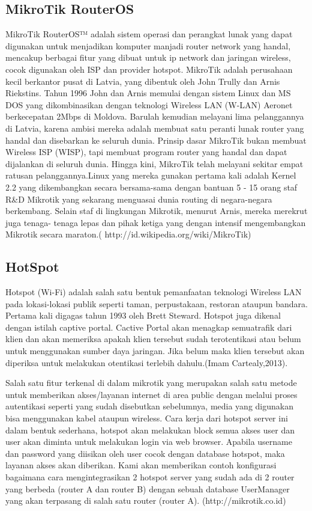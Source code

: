 \documentclass{jtetiproposalskripsi}
\begin{document}
\subsection{MikroTik RouterOS}
MikroTik RouterOS™ adalah sistem operasi dan perangkat lunak yang dapat  digunakan  untuk  menjadikan  komputer  manjadi  router  network  yang handal, mencakup berbagai fitur yang dibuat untuk ip network dan jaringan wireless, cocok digunakan oleh ISP dan provider hotspot.
MikroTik  adalah  perusahaan  kecil  berkantor  pusat  di  Latvia,  yang dibentuk oleh  John  Trully dan  Arnis  Riekstins.  Tahun  1996  John  dan  Arnis memulai dengan sistem Linux dan MS DOS yang dikombinasikan dengan teknologi Wireless LAN (W-LAN) Aeronet berkecepatan 2Mbps di Moldova. Barulah kemudian melayani lima pelanggannya di Latvia, karena ambisi mereka adalah membuat satu peranti lunak router yang handal dan disebarkan ke seluruh dunia.  Prinsip  dasar  MikroTik  bukan  membuat  Wireless  ISP  (WISP),  tapi membuat program router yang handal dan dapat dijalankan di seluruh dunia. Hingga kini, MikroTik telah melayani sekitar empat ratusan pelanggannya.Linux yang mereka gunakan pertama kali adalah Kernel 2.2 yang dikembangkan secara  bersama-sama dengan  bantuan  5  -  15  orang staf  R\&D Mikrotik yang sekarang menguasai dunia routing di negara-negara berkembang. Selain staf di lingkungan Mikrotik, menurut Arnis, mereka merekrut juga tenaga- tenaga lepas dan pihak ketiga yang dengan intensif mengembangkan Mikrotik secara maraton.( http://id.wikipedia.org/wiki/MikroTik)

\subsection{ HotSpot}
Hotspot (Wi-Fi) adalah salah satu bentuk pemanfaatan teknologi Wireless LAN  pada  lokasi-lokasi  publik  seperti  taman,  perpustakaan, restoran  ataupun bandara.  Pertama  kali  digagas  tahun  1993  oleh  Brett  Steward.  Hotspot  juga dikenal dengan istilah captive portal. Cactive Portal akan menagkap semuatrafik dari klien dan akan memeriksa apakah klien tersebut sudah terotentikasi atau belum untuk menggunakan sumber daya jaringan. Jika belum maka klien tersebut akan diperiksa untuk melakukan otentikasi terlebih dahulu.(Imam Cartealy,2013). 



Salah satu fitur terkenal di dalam mikrotik yang merupakan salah satu metode untuk memberikan akses/layanan internet di area public dengan melalui proses autentikasi seperti yang sudah disebutkan sebelumnya, media yang digunakan bisa menggunakan kabel ataupun wireless. Cara kerja dari hotspot server ini dalam bentuk sederhana, hotspot akan melakukan block semua akses user dan user akan diminta untuk melakukan login via web browser. Apabila username dan password yang diisikan oleh user cocok dengan database hotspot, maka layanan akses akan diberikan. Kami akan memberikan contoh konfigurasi bagaimana cara mengintegrasikan 2 hotspot server yang sudah ada di 2 router yang berbeda (router A dan router B) dengan sebuah database UserManager yang akan terpasang di salah satu router (router A). (http://mikrotik.co.id)
\end{document}

